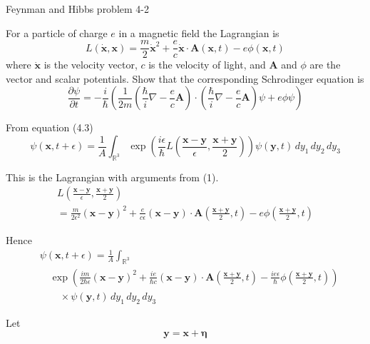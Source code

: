 \documentclass[12pt]{article}
\newcommand\INT{\int_{\mathbb R^3}}
\begin{document}
\begin{center}
Feynman and Hibbs problem 4-2
\end{center}

For a particle of charge $e$ in a magnetic field the Lagrangian is
\begin{equation*}
L(\dot{\mathbf x},\mathbf x)=\frac{m}{2}\dot{\mathbf x}^2
+\frac{e}{c}\dot{\mathbf x}\cdot\mathbf A(\mathbf x,t)-e\phi(\mathbf x,t)
\end{equation*}
where $\dot{\mathbf x}$ is the velocity vector,
$c$ is the velocity of light, and $\mathbf A$ and $\phi$
are the vector and scalar potentials.
Show that the corresponding Schrodinger equation is
\begin{equation*}
\frac{\partial\psi}{\partial t}
=-\frac{i}{\hbar}\left(
\frac{1}{2m}\left(\frac{\hbar}{i}\nabla-\frac{e}{c}\mathbf A\right)
\cdot
\left(\frac{\hbar}{i}\nabla-\frac{e}{c}\mathbf A\right)\psi
+e\phi\psi
\right)
\tag{4.18}
\end{equation*}

From equation (4.3)
\begin{equation*}
\psi(\mathbf x,t+\epsilon)=\frac{1}{A}\INT\exp\left(
\frac{i\epsilon}{\hbar}L\left(\frac{\mathbf x-\mathbf y}{\epsilon},\frac{\mathbf x+\mathbf y}{2}\right)
\right)\psi(\mathbf y,t)
\,dy_1\,dy_2\,dy_3
\tag{1}
\end{equation*}

This is the Lagrangian with arguments from (1).
\begin{multline*}
L\left(\frac{\mathbf x-\mathbf y}{\epsilon},\frac{\mathbf x+\mathbf y}{2}\right)
\\
=\frac{m}{2\epsilon^2}(\mathbf x-\mathbf y)^2
+\frac{e}{c\epsilon}(\mathbf x-\mathbf y)\cdot\mathbf A\left(\frac{\mathbf x+\mathbf y}{2},t\right)
-e\phi\left(\frac{\mathbf x+\mathbf y}{2},t\right)
\end{multline*}

Hence
\begin{align*}
&\psi(\mathbf x,t+\epsilon)=\frac{1}{A}\INT
\\
&\quad\exp
\left(
\frac{im}{2\hbar\epsilon}(\mathbf x-\mathbf y)^2
+\frac{ie}{\hbar c}(\mathbf x-\mathbf y)\cdot\mathbf A\left(\frac{\mathbf x+\mathbf y}{2},t\right)
-\frac{ie\epsilon}{\hbar}\phi\left(\frac{\mathbf x+\mathbf y}{2},t\right)
\right)
\\
&\quad\quad{}\times\psi(\mathbf y,t)
\,dy_1\,dy_2\,dy_3
\end{align*}

Let
\begin{equation*}
\mathbf y=\mathbf x+\boldsymbol\eta
\end{equation*}
\end{document}

